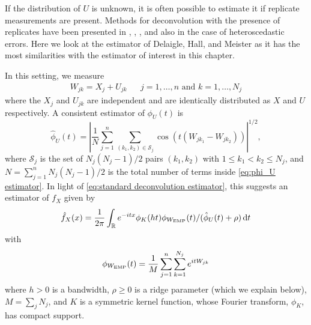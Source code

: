 	If the distribution of $U$ is unknown, it is often possible to estimate it if replicate measurements are present. Methods for deconvolution with the presence of replicates have been presented in \cite{Li1998-mj}, \cite{Lin2006-mm}, \cite{Delaigle2008-hl}, and also \cite{McIntyre2011-fg} in the case of heteroscedastic errors. Here we look at the estimator of Delaigle, Hall, and Meister \cite{Delaigle2008-hl} as it has the most similarities with the estimator of interest in this chapter.

	In this setting, we measure
	\begin{align}
		W_{jk} = X_j + U_{jk} && j = 1, \dots, n \text{ and } k = 1, \dots, N_j
	\end{align}
	where the $X_j$ and $U_{jk}$ are independent and are identically distributed as $X$ and $U$ respectively. A consistent estimator of $\phi_U(t)$ is
	\begin{equation}
		\hat{\phi}_U(t) = \left|\frac{1}{N} \sum_{j = 1}^n \sum_{(k_1, k_2) \in \mathscr{S}_j} \cos \left(t (W_{jk_1} - W_{jk_2})\right)\right|^{1/2},
		\label{eq:phi_U estimator}
	\end{equation}
	where $\mathscr{S}_j$ is the set of $N_j(N_j - 1)/2$ pairs $(k_1, k_2)$ with $1 \leq k_1 < k_2 \leq N_j$, and $N = \sum_{j=1}^n N_j(N_j - 1)/2$ is the total number of terms inside \eqref{eq:phi_U estimator}.
	In light of \eqref{eq:standard deconvolution estimator}, this suggests an estimator of $f_X$ given by 
	\begin{equation}
	\label{eq:replicates estimator}
		\hat{f}_X(x) = \frac{1}{2\pi} \int_\mathbb{R} e^{-itx} \phi_K(ht) \phi_{W_\mathrm{EMP}}(t)  / (\hat{\phi}_U(t) + \rho )\, \mathrm{d} t
	\end{equation}
	with
	\begin{equation}
		\phi_{W_\mathrm{EMP}}(t) = \frac{1}{M} \sum_{j = 1}^n \sum_{k= 1}^{N_j} e^{i t W_{jk}}
	\end{equation}
	where
	$h > 0$ is a bandwidth, $\rho \geq 0$ is a ridge parameter (which we explain below), $M = \sum_j N_j$, and $K$ is a symmetric kernel function, whose Fourier transform, $\phi_K$, has compact support.

